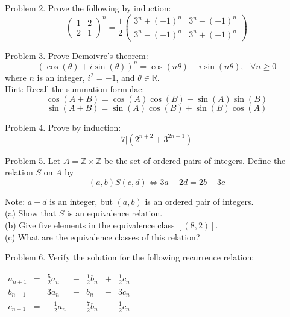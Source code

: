 \documentclass[16 pt]{amsart}
\theoremstyle{definition}
\theoremstyle{remark}
\numberwithin{equation}{subsection}
\newcommand{\R}{\mathbb{R}}
\newcommand{\Z}{\mathbb{Z}}
\begin{document}
Problem 2. Prove the following by induction:
\[
\begin{pmatrix}
1 & 2 \\
2 & 1
\end{pmatrix}^n =
\frac{1}{2} \begin{pmatrix}
{3^n + (-1)^n} & {3^n - (-1)^n}\\
{3^n - (-1)^n} & {3^n + (-1)^n}
\end{pmatrix}
\]


\newpage

Problem 3. Prove Demoivre's theorem:
\[
(\cos(\theta) + i\sin(\theta))^n = \cos(n\theta) + i \sin(n\theta), \text{   } \forall n \ge 0
\]
where $n$ is an integer, $i^2=-1$, and $\theta\in\R$.\\



Hint:
Recall the summation formulae: 
\[
\cos(A+B) = \cos(A)\cos(B) - \sin(A)\sin(B)
\]
\[
\sin(A+B) = \sin(A)\cos(B) + \sin(B)\cos(A)
\]

\newpage

Problem 4. Prove by induction:
\[
7 | (2^{n+2}+3^{2n+1})
\]

\newpage

Problem 5. Let $A = \Z \times \Z$ be the set of ordered pairs of integers.  Define the relation $S$ on $A$ by
\[
(a,b) S (c,d) \iff 3a+2d = 2b+3c
\]

Note: $a+d$ is an integer, but $(a,b)$ is an ordered pair of integers.\\

(a) Show that $S$ is an equivalence relation.\\

(b) Give five elements in the equivalence class $[(8,2)]$.\\

(c) What are the equivalence classes of this relation?

\newpage

Problem 6. Verify the solution for the following recurrence relation:

$\begin{array}{ccccccc}
a_{n+1} & = & \frac{5}{2} a_n &-& \frac{1}{2}b_n &+& \frac{1}{2}c_n\\
b_{n+1} & = & 3 a_n &-& b_n &-& 3 c_n\\
c_{n+1} & = & -\frac{1}{2}a_n &-& \frac{7}{2}b_n &-& \frac{1}{2}c_n
\end{array}$ \\
\end{document}
